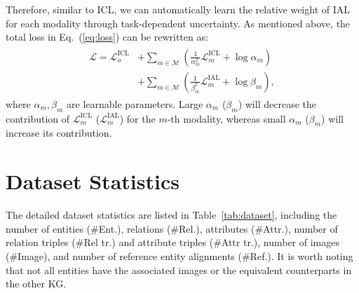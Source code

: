 \documentclass[11pt]{article}
\begin{document}
Therefore, similar to ICL, we can automatically learn the relative weight of IAL for each modality through task-dependent uncertainty.
As mentioned above, the total loss in Eq.~(\ref{eq:loss}) can be rewritten as:
\begin{gather}
\begin{aligned}
    \mathcal{L} 
    = \mathcal{L}^{\text{ICL}}_o &+ 
    \textstyle\sum_{m\in\mathcal{M}} \left(\frac{1}{\alpha^2_m}\mathcal{L}^{\text{ICL}}_m +\log{\alpha_m}\right) \\
    \qquad&+ 
    \textstyle\sum_{m\in\mathcal{M}} \left(\frac{1}{\beta^2_m}\mathcal{L}^{\text{IAL}}_m +\log{\beta_m}\right),
\end{aligned}
\end{gather}
where $\alpha_m, \beta_m$ are learnable parameters. Large $\alpha_m$ ($\beta_m$) will decrease the contribution of $\mathcal{L}^{\text{ICL}}_m$ ($\mathcal{L}^{\text{IAL}}_m$) for the $m$-th modality, whereas small $\alpha_m$ ($\beta_m$) will increase its contribution.

\section{Dataset Statistics}

The detailed dataset statistics are listed in Table~\ref{tab:dataset}, including the number of entities (\#Ent.), relations (\#Rel.), attributes (\#Attr.), number of relation triples (\#Rel tr.) and attribute triples (\#Attr tr.), number of images (\#Image), and number of reference entity alignments (\#Ref.).
It is worth noting that not all entities have the associated images or the equivalent counterparts in the other KG.
 
\end{document}
